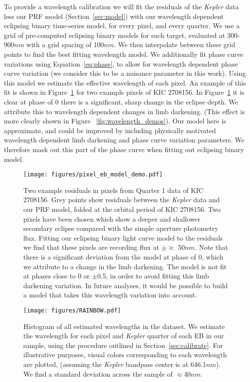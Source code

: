 \documentclass[iop]{emulateapj}
\newcommand{\kepler}{\emph{Kepler}\xspace}
\newcommand{\target}{KIC 2708156\xspace}
\begin{document}
To provide a wavelength calibration we will fit the residuals of the \kepler data less our PRF model (Section~\ref{sec:model}) with our wavelength dependent eclipsing binary time-series model, for every pixel, and every quarter. We use a grid of pre-computed eclipsing binary models for each target, evaluated at 300-900$nm$ with a grid spacing of 100$nm$. We then interpolate between these grid points to find the best fitting wavelength model. We additionally fit phase curve variations using Equation~\ref{eq:phase}, to allow for wavelength dependent phase curve variation (we consider this to be a nuisance parameter in this work). Using this model we estimate the effective wavelength of each pixel. An example of this fit is shown in Figure~\ref{fig:examplepixelfit} for two example pixels of \target. In Figure~\ref{fig:examplepixelfit} it is clear at phase of 0 there is a significant, sharp change in the eclipse depth. We attribute this to wavelength dependent changes in limb darkening. (This effect is more clearly shown in Figure ~\ref{fig:wavelength_demos}). Our model here is approximate, and could be improved by including physically motivated wavelength dependent limb darkening and phase curve variation parameters. We therefore mask out this part of the phase curve when fitting out eclipsing binary model.

\begin{figure}
    \centering
    \texttt{[image: figures/pixel\_eb\_model\_demo.pdf]}
    \caption{Two example residuals in pixels from Quarter 1 data of \target. Grey points show residuals between the \kepler data and our PRF model, folded at the orbital period of \target. Two pixels have been chosen which show a deeper and shallower secondary eclipse compared with the simple aperture photometry flux. Fitting our eclipsing binary light curve model to the residuals we find that these pixels are recording flux at $\pm \approx$ 50$nm$. Note that there is a significant deviation from the model at phase of 0, which we attribute to a change in the limb darkening. The model is not fit at phases close to 0 or $\pm$0.5, in order to avoid fitting this limb darkening variation. In future analyses, it would be possible to build a model that takes this wavelength variation into account.}
    \label{fig:examplepixelfit}
\end{figure}



\begin{figure}
    \centering
    \texttt{[image: figures/RAINBOW.pdf]}
    \caption{Histogram of all estimated wavelengths in the dataset. We estimate the wavelength for each pixel and \kepler quarter of each EB in our sample, using the procedure outlined in Section~\ref{sec:calibrate}. For illustrative purposes, visual colors corresponding to each wavelength are plotted, (assuming the \kepler bandpass center is at 646.1$nm$). We find a standard deviation across the sample of $\approx$40$nm$.}
    \label{fig:rainbow}
\end{figure}
\end{document}

